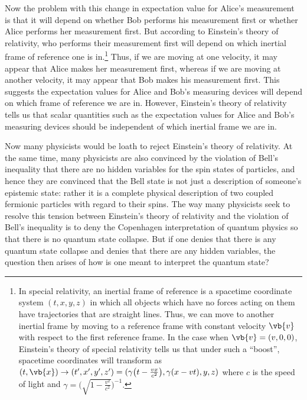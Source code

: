       Now the problem\label{Copenhagenproblem} with this change in expectation value for Alice's measurement is that it will depend on whether Bob performs his measurement first or whether Alice performs her measurement first. But according to Einstein's theory of relativity, who performs their measurement first will depend on which inertial frame of reference one is in.\footnote{In special relativity, an inertial frame of reference is a spacetime coordinate system $(t, x, y, z)$ in which all objects which have no forces acting on them have trajectories that are straight lines. Thus, we can move to another inertial frame by moving to a reference frame with constant velocity $\vb{v}$ with respect to the first reference frame. In the case when $\vb{v}=(v, 0, 0)$, Einstein's theory of special relativity tells us that under such a “boost”, spacetime coordinates will transform as $(t,\vb{x})\rightarrow(t',x',y',z')=(\gamma\big(t - \frac{vx}{c^2}\big),\gamma(x-vt),y,z)$ where $c$ is the speed of light and $\gamma=\Big(\sqrt{1-\frac{v^2}{c^2}}\Big)^{-1}.$ } Thus, if we are moving at one velocity, it may appear that Alice makes her measurement first, whereas if we are moving at another velocity, it may appear that Bob makes his measurement first. This suggests the expectation values for Alice and Bob's measuring devices will depend on which frame of reference we are in. However, Einstein's theory of relativity tells us that scalar quantities such as the expectation values for Alice and Bob's measuring devices should be independent of which inertial frame we are in. 
      
      Now many physicists would be loath to reject Einstein's theory of relativity. At the same time, many physicists are also convinced by the violation of Bell's inequality that there are no hidden variables for the spin states of particles, and hence they are convinced that the Bell state is not just a description of someone's epistemic state: rather it is a complete physical description of two coupled fermionic particles with regard to their spins. The way many physicists seek to resolve this tension between Einstein's theory of relativity and the violation of Bell's inequality is to deny the Copenhagen interpretation of quantum physics so that there is no quantum state collapse. But if one denies that there is any quantum state collapse and denies that there are any hidden variables, the question then arises of how is one  meant to interpret the quantum state? 
     